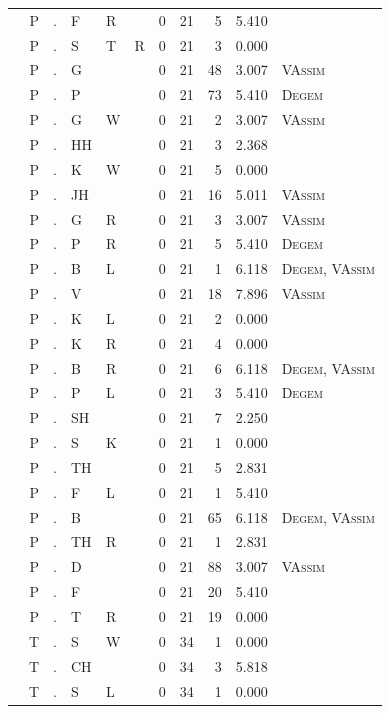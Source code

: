 \documentclass[12pt]{article}
\begin{document}
\begin{longtable}{r@{ } r@{ } c@{ } l@{ } l@{ } l@{ } r r r r l }
 & P & . & F & R &  & 0 & 21 & 5 & 5.410 &  \\
 & P & . & S & T & R & 0 & 21 & 3 & 0.000 &  \\
 & P & . & G &  &  & 0 & 21 & 48 & 3.007 & \textsc{VAssim} \\
 & P & . & P &  &  & 0 & 21 & 73 & 5.410 & \textsc{Degem} \\
 & P & . & G & W &  & 0 & 21 & 2 & 3.007 & \textsc{VAssim} \\
 & P & . & HH &  &  & 0 & 21 & 3 & 2.368 &  \\
 & P & . & K & W &  & 0 & 21 & 5 & 0.000 &  \\
 & P & . & JH &  &  & 0 & 21 & 16 & 5.011 & \textsc{VAssim} \\
 & P & . & G & R &  & 0 & 21 & 3 & 3.007 & \textsc{VAssim} \\
 & P & . & P & R &  & 0 & 21 & 5 & 5.410 & \textsc{Degem} \\
 & P & . & B & L &  & 0 & 21 & 1 & 6.118 & \textsc{Degem}, \textsc{VAssim} \\
 & P & . & V &  &  & 0 & 21 & 18 & 7.896 & \textsc{VAssim} \\
 & P & . & K & L &  & 0 & 21 & 2 & 0.000 &  \\
 & P & . & K & R &  & 0 & 21 & 4 & 0.000 &  \\
 & P & . & B & R &  & 0 & 21 & 6 & 6.118 & \textsc{Degem}, \textsc{VAssim} \\
 & P & . & P & L &  & 0 & 21 & 3 & 5.410 & \textsc{Degem} \\
 & P & . & SH &  &  & 0 & 21 & 7 & 2.250 &  \\
 & P & . & S & K &  & 0 & 21 & 1 & 0.000 &  \\
 & P & . & TH &  &  & 0 & 21 & 5 & 2.831 &  \\
 & P & . & F & L &  & 0 & 21 & 1 & 5.410 &  \\
 & P & . & B &  &  & 0 & 21 & 65 & 6.118 & \textsc{Degem}, \textsc{VAssim} \\
 & P & . & TH & R &  & 0 & 21 & 1 & 2.831 &  \\
 & P & . & D &  &  & 0 & 21 & 88 & 3.007 & \textsc{VAssim} \\
 & P & . & F &  &  & 0 & 21 & 20 & 5.410 &  \\
 & P & . & T & R &  & 0 & 21 & 19 & 0.000 &  \\
 & T & . & S & W &  & 0 & 34 & 1 & 0.000 &  \\
 & T & . & CH &  &  & 0 & 34 & 3 & 5.818 &  \\
 & T & . & S & L &  & 0 & 34 & 1 & 0.000 &  \\

\end{longtable}
\end{document}
